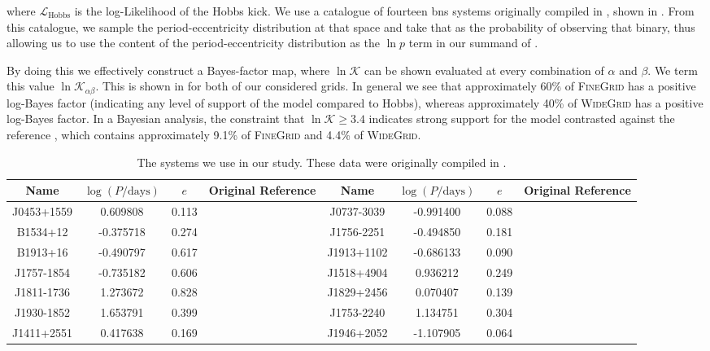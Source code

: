 where $\mathcal{L}_\text{Hobbs}$ is the log-Likelihood of the Hobbs kick. We use a catalogue of fourteen \gls{bns} systems originally compiled in \citet{Vigna-gomez:2018}, shown in . From this catalogue, we sample the period-eccentricity distribution at that space and take that as the probability of observing that binary, thus allowing us to use the content of the period-eccentricity distribution as the $\ln p$ term in our summand of .

By doing this we effectively construct a Bayes-factor map, where $\ln\mathcal{K}$ can be shown evaluated at every combination of $\alpha$ and $\beta$. We term this value $\ln\mathcal{K}_{\alpha\beta}$. This is shown in  for both of our considered grids. In general we see that approximately 60\% of \textsc{FineGrid} has a positive log-Bayes factor (indicating any level of support of the model compared to Hobbs), whereas approximately 40\% of \textsc{WideGrid} has a positive log-Bayes factor. In a Bayesian analysis, the constraint that $\ln\mathcal{K} \geq 3.4$ indicates strong support for the model contrasted against the reference \citep[i.e.,][]{Hobbs:2005}, which contains approximately 9.1\% of \textsc{FineGrid} and 4.4\% of \textsc{WideGrid}.

\begin{table}
    \centering
    \small
    \tabcolsep=0.11cm
    \begin{tabular}{cccc||cccc}
        \hline
        Name & $\log (P / \text{days})$ & $e$ & Original Reference & Name & $\log (P / \text{days})$ & $e$ & Original Reference \\
        \hline
         J0453+1559 &  0.609808 &  0.113 & \citet{Martinez:2015}       & J0737-3039 & -0.991400 &  0.088 & \citet{Kramer:2006} \\
           B1534+12 & -0.375718 &  0.274 & \citet{Fonseca:2014} & J1756-2251 & -0.494850 &  0.181 & \citet{Faulkner:2005} \\
           B1913+16 & -0.490797 &  0.617 & \citet{Hulse:1975}       & J1913+1102 & -0.686133 &  0.090 & \citet{Lazarus:2016} \\
         J1757-1854 & -0.735182 &  0.606 & \citet{Cameron:2018}          & J1518+4904 &  0.936212 &  0.249 & \citet{Janssen:2008} \\
         J1811-1736 &  1.273672 &  0.828 & \citet{Corongiu:2007}       & J1829+2456 &  0.070407 &  0.139 & \citet{Champion:2004} \\
         J1930-1852 &  1.653791 &  0.399 & \citet{Swiggum:2015}           & J1753-2240 &  1.134751 &  0.304 & \citet{Keith:2009} \\
         J1411+2551 &  0.417638 &  0.169 & \citet{Martinez:2017}       & J1946+2052 & -1.107905 &  0.064 & \citet{Stovall:2018} \\
        \hline
    \end{tabular}
    \caption[The systems we use in our study.]{The systems we use in our study. These data were originally compiled in \citet{Vigna-gomez:2018}.}
    \label{tab:observed_BNSes}
\end{table}

